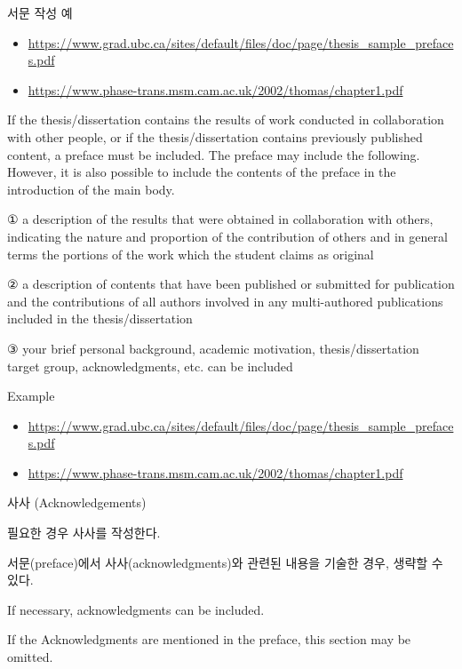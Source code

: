 \documentclass[11pt]{report}
\numberwithin{figure}{chapter}
\theoremstyle{plain}
\theoremstyle{definition}
\theoremstyle{corollary}
\theoremstyle{definition}
\theoremstyle{plain}
\theoremstyle{definition}
\theoremstyle{plain}
\begin{document}
\bigskip
서문 작성 예
\begin{itemize}
\item\url{https://www.grad.ubc.ca/sites/default/files/doc/page/thesis_sample_prefaces.pdf}
\item\url{https://www.phase-trans.msm.cam.ac.uk/2002/thomas/chapter1.pdf}
\end{itemize}

\bigskip
If the thesis/dissertation contains the results of work conducted in collaboration with other people, or if the thesis/dissertation contains previously published content, a preface must be included.
The preface may include the following.
However, it is also possible to include the contents of the preface in the introduction of the main body.

① a description of the results that were obtained in collaboration with others, indicating the nature and proportion of the contribution of others and in general terms the portions of the work which the student claims as original

② a description of contents that have been published or submitted for publication and the contributions of all authors involved in any multi-authored publications included in the thesis/dissertation

③ your brief personal background, academic motivation, thesis/dissertation target group, acknowledgments, etc. can be included 

\bigskip
Example
\begin{itemize}
\item\url{https://www.grad.ubc.ca/sites/default/files/doc/page/thesis_sample_prefaces.pdf}
\item\url{https://www.phase-trans.msm.cam.ac.uk/2002/thomas/chapter1.pdf}
\end{itemize}

\newpage
\begin{center}
\large
사사 (Acknowledgements)
\end{center}
\normalsize
필요한 경우 사사를 작성한다.

서문(preface)에서 사사(acknowledgments)와 관련된 내용을 기술한 경우, 생략할 수 있다.

If necessary, acknowledgments can be included.

If the Acknowledgments are mentioned in the preface, this section may be omitted.  
\end{document}
